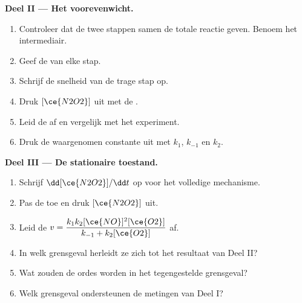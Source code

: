 \begin{problem}
\medskip
\noindent\textbf{Deel II --- Het voorevenwicht.}
\begin{enumerate}[resume]
  \item Controleer dat de twee stappen samen de totale reactie geven.
        Benoem het intermediair.
  \item Geef de  van elke stap.
  \item Schrijf de snelheid van de trage stap op.
  \item Druk $[\ce{N2O2}]$ uit met de .
  \item Leid de  af en vergelijk met het experiment.
  \item Druk de waargenomen constante uit met $k_1$, $k_{-1}$ en $k_2$.
\end{enumerate}

\medskip
\noindent\textbf{Deel III --- De stationaire toestand.}
\begin{enumerate}[resume]
  \item Schrijf $\dd[\ce{N2O2}]/\dd t$ op voor het volledige mechanisme.
  \item Pas de  toe en druk $[\ce{N2O2}]$
        uit.
  \item Leid de  $v = \dfrac{k_1k_2[\ce{NO}]^2[\ce{O2}]}{k_{-1} +
        k_2[\ce{O2}]}$ af.
  \item In welk grensgeval herleidt ze zich tot het resultaat van Deel II?
  \item Wat zouden de ordes worden in het tegengestelde grensgeval?
  \item Welk grensgeval ondersteunen de metingen van Deel I?
\end{enumerate}


\end{problem}
